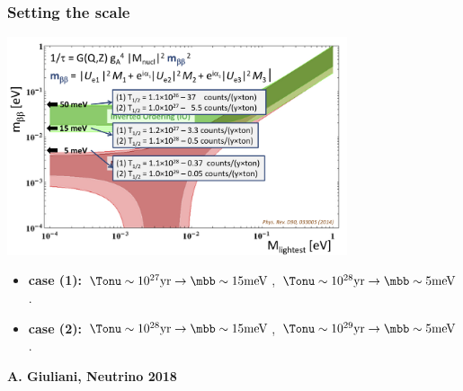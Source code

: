 \begin{frame}
\frametitle{Setting the scale} 
 \begin{center}
\includegraphics[width=0.75\textwidth]{moriond/setting_the_scale.png}
\end{center}
\begin{itemize}
\item {\bf case (1):}  $\Tonu \sim 10^{27} {\rm yr} \rightarrow \mbb \sim {\rm 15 meV}$, 
$\Tonu \sim 10^{28} {\rm yr} \rightarrow \mbb \sim {\rm 5 meV}$.
\item {\bf case (2):} $\Tonu \sim 10^{28} {\rm yr} \rightarrow \mbb \sim {\rm 15 meV}$, 
$\Tonu \sim 10^{29} {\rm yr} \rightarrow \mbb \sim {\rm 5 meV}$.
\end{itemize}
 \begin{flushright}
{\bf A. Giuliani, Neutrino 2018}
\end{flushright}

\end{frame}

